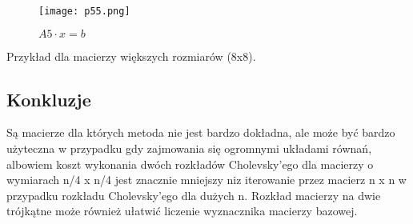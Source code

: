 \documentclass{article}
\begin{document}
\begin{figure}[hbt!]
  \centering
    \texttt{[image: p55.png]}
    \caption{$A5 \cdot x = b$}
    \label{fig:example}
\end{figure}

Przykład dla macierzy większych rozmiarów (8x8).

\vspace{100pt}

\subsection{Konkluzje}
\vspace{6pt}
Są macierze dla których metoda nie jest bardzo dokładna, ale może być bardzo użyteczna w przypadku gdy zajmowania się ogromnymi układami równań, albowiem koszt wykonania dwóch rozkładów Cholevsky'ego dla macierzy o wymiarach n/4 x n/4 jest znacznie mniejszy niz iterowanie przez macierz n x n w przypadku rozkładu Cholevsky'ego dla dużych n. Rozkład macierzy na dwie trójkątne może również ułatwić liczenie wyznacznika macierzy bazowej.
\end{document}
